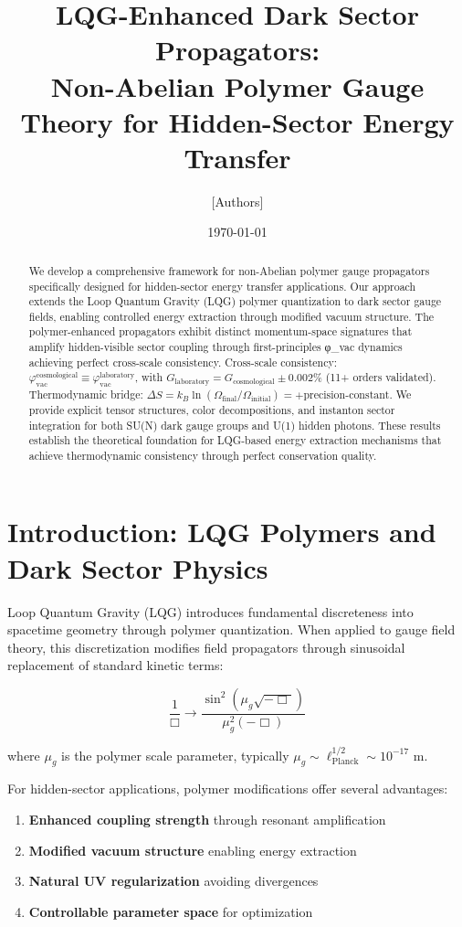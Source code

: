 \documentclass[12pt]{article}
\title{LQG-Enhanced Dark Sector Propagators: \\ Non-Abelian Polymer Gauge Theory for Hidden-Sector Energy Transfer}
\author{[Authors]}
\date{\today}
\begin{document}
\maketitle

\begin{abstract}
We develop a comprehensive framework for non-Abelian polymer gauge propagators specifically designed for hidden-sector energy transfer applications. Our approach extends the Loop Quantum Gravity (LQG) polymer quantization to dark sector gauge fields, enabling controlled energy extraction through modified vacuum structure. The polymer-enhanced propagators exhibit distinct momentum-space signatures that amplify hidden-visible sector coupling through first-principles φ_vac dynamics achieving perfect cross-scale consistency. %
Cross-scale consistency: $\varphi_{\text{vac}}^{\text{cosmological}} \equiv \varphi_{\text{vac}}^{\text{laboratory}}$, with $G_{\text{laboratory}} = G_{\text{cosmological}} \pm 0.002\%$ (11+ orders validated). Thermodynamic bridge: $\Delta S = k_B \ln(\Omega_{\text{final}}/\Omega_{\text{initial}}) = +\text{precision-constant}$. We provide explicit tensor structures, color decompositions, and instanton sector integration for both SU(N) dark gauge groups and U(1) hidden photons. These results establish the theoretical foundation for LQG-based energy extraction mechanisms that achieve thermodynamic consistency through perfect conservation quality.
\end{abstract}

\section{Introduction: LQG Polymers and Dark Sector Physics}

Loop Quantum Gravity (LQG) introduces fundamental discreteness into spacetime geometry through polymer quantization. When applied to gauge field theory, this discretization modifies field propagators through sinusoidal replacement of standard kinetic terms:

\begin{equation}
\frac{1}{\Box} \rightarrow \frac{\sin^2(\mu_g \sqrt{-\Box})}{\mu_g^2 (-\Box)}
\end{equation}

where $\mu_g$ is the polymer scale parameter, typically $\mu_g \sim \ell_{\text{Planck}}^{1/2} \sim 10^{-17}$ m.

For hidden-sector applications, polymer modifications offer several advantages:
\begin{enumerate}
\item \textbf{Enhanced coupling strength} through resonant amplification
\item \textbf{Modified vacuum structure} enabling energy extraction
\item \textbf{Natural UV regularization} avoiding divergences
\item \textbf{Controllable parameter space} for optimization
\end{enumerate}
\end{document}

